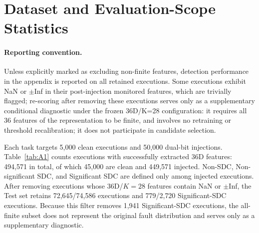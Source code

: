 \section{Dataset and Evaluation-Scope Statistics}
\label{app:dataset}

\paragraph{Reporting convention.}
Unless explicitly marked as excluding non-finite features, detection performance in the appendix is reported on all retained executions. Some executions exhibit NaN or $\pm$Inf in their post-injection monitored features, which are trivially flagged; re-scoring after removing these executions serves only as a supplementary conditional diagnostic under the frozen 36D/K=28 configuration: it requires all 36 features of the representation to be finite, and involves no retraining or threshold recalibration; it does not participate in candidate selection.

Each task targets 5{,}000 clean executions and 50{,}000 dual-bit injections. Table~\ref{tab:A1} counts executions with successfully extracted 36D features: 494{,}571 in total, of which 45{,}000 are clean and 449{,}571 injected. Non-SDC, Non-significant SDC, and Significant SDC are defined only among injected executions. After removing executions whose 36D/$K{=}28$ features contain NaN or $\pm$Inf, the Test set retains 72{,}645/74{,}586 executions and 779/2{,}720 Significant-SDC executions. Because this filter removes 1{,}941 Significant-SDC executions, the all-finite subset does not represent the original fault distribution and serves only as a supplementary diagnostic.

